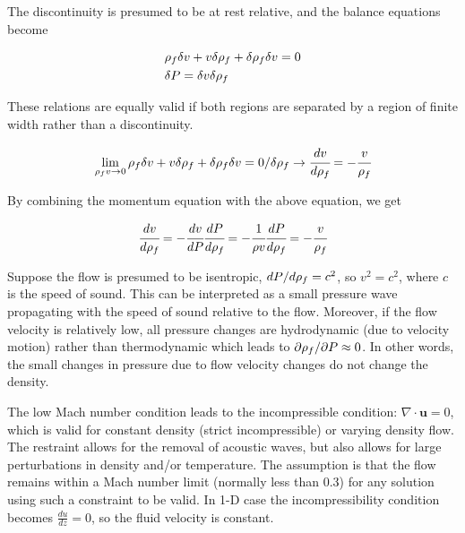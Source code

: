 \documentclass[a4paper,fleqn]{cas-dc}
\begin{document}
The discontinuity is presumed to be at rest relative, and the balance equations become		

{\footnotesize
	\begin{align*}
		&{\color{black}\rho_f} \delta v + v \delta {\color{black}\rho_f} + \delta {\color{black}\rho_f} \delta v = 0 \\
		&\delta {\color{black}P} = \delta v \delta {\color{black}\rho_f}
	\end{align*}
}

These relations are equally valid if both regions are separated by a region of finite width rather than a discontinuity. 

{\footnotesize
	\begin{equation*}
		\lim_{{\color{black}\rho_f} v \rightarrow 0} {\color{black}\rho_f} \delta v + v \delta {\color{black}\rho_f} + \delta {\color{black}\rho_f} \delta v = 0 / \delta {\color{black}\rho_f} \rightarrow \cfrac{d v}{d {\color{black}\rho_f}} = - \cfrac{v}{{\color{black}\rho_f}}
	\end{equation*}
}

By combining the momentum equation with the above equation, we get

{\footnotesize
	\begin{equation} \label{EQ: Pressure_Velocity}
		\cfrac{d v}{d {\color{black}\rho_f}} = - \cfrac{d v}{d{\color{black}P}} \cfrac{d {\color{black}P}}{d {\color{black}\rho_f}} = -\cfrac{1}{\rho v} \cfrac{d{\color{black}P}}{d{\color{black}\rho_f}} = -\cfrac{v}{{\color{black}\rho_f}}
	\end{equation}
}

Suppose the flow is presumed to be isentropic, $d{\color{black}P}/d{\color{black}\rho_f} = c^2$, so $v^2=c^2$, where $c$ is the speed of sound. This can be interpreted as a small pressure wave propagating with the speed of sound relative to the flow. Moreover, if the flow velocity is relatively low, all pressure changes are hydrodynamic (due to velocity motion) rather than thermodynamic which leads to $\partial {\color{black}\rho_f} / \partial {\color{black}P} \approx 0$. In other words, the small changes in pressure due to flow velocity changes do not change the density. 

The low Mach number condition leads to the incompressible condition: $\nabla \cdot \mathbf {u} =0$, which is valid for constant density (strict incompressible) or varying density flow. The restraint allows for the removal of acoustic waves, but also allows for large perturbations in density and/or temperature. The assumption is that the flow remains within a Mach number limit (normally less than 0.3) for any solution using such a constraint to be valid. In 1-D case the incompressibility condition becomes $\frac{du}{dz} = 0$, so the fluid velocity is constant.
\end{document}
